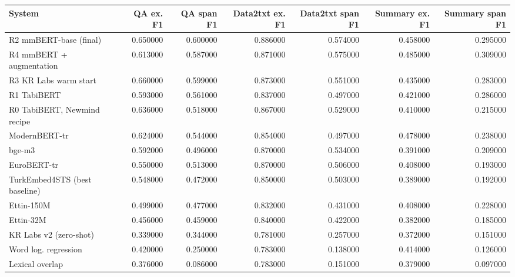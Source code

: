 \begin{tabular}{lrrrrrr}
\toprule
System & QA ex. F1 & QA span F1 & Data2txt ex. F1 & Data2txt span F1 & Summary ex. F1 & Summary span F1 \\
\midrule
R2 mmBERT-base (final) & 0.650000 & 0.600000 & 0.886000 & 0.574000 & 0.458000 & 0.295000 \\
R4 mmBERT + augmentation & 0.613000 & 0.587000 & 0.871000 & 0.575000 & 0.485000 & 0.309000 \\
R3 KR Labs warm start & 0.660000 & 0.599000 & 0.873000 & 0.551000 & 0.435000 & 0.283000 \\
R1 TabiBERT & 0.593000 & 0.561000 & 0.837000 & 0.497000 & 0.421000 & 0.286000 \\
R0 TabiBERT, Newmind recipe & 0.636000 & 0.518000 & 0.867000 & 0.529000 & 0.410000 & 0.215000 \\
ModernBERT-tr & 0.624000 & 0.544000 & 0.854000 & 0.497000 & 0.478000 & 0.238000 \\
bge-m3 & 0.592000 & 0.496000 & 0.870000 & 0.534000 & 0.391000 & 0.209000 \\
EuroBERT-tr & 0.550000 & 0.513000 & 0.870000 & 0.506000 & 0.408000 & 0.193000 \\
TurkEmbed4STS (best baseline) & 0.548000 & 0.472000 & 0.850000 & 0.503000 & 0.389000 & 0.192000 \\
Ettin-150M & 0.499000 & 0.477000 & 0.832000 & 0.431000 & 0.408000 & 0.228000 \\
Ettin-32M & 0.456000 & 0.459000 & 0.840000 & 0.422000 & 0.382000 & 0.185000 \\
KR Labs v2 (zero-shot) & 0.339000 & 0.344000 & 0.781000 & 0.257000 & 0.372000 & 0.151000 \\
Word log. regression & 0.420000 & 0.250000 & 0.783000 & 0.138000 & 0.414000 & 0.126000 \\
Lexical overlap & 0.376000 & 0.086000 & 0.783000 & 0.151000 & 0.379000 & 0.097000 \\
\bottomrule
\end{tabular}
